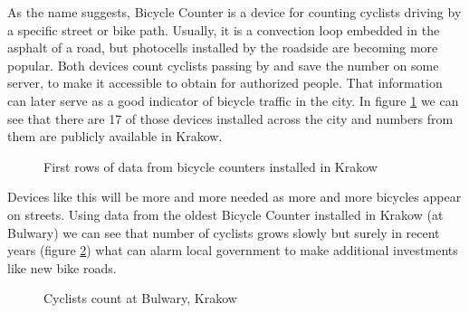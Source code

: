 As the name suggests, Bicycle Counter is a device for counting cyclists driving by a specific street or bike path. Usually, it is a convection loop embedded in the asphalt of a road, but photocells installed by the roadside are becoming more popular. Both devices count cyclists passing by and save the number on some server, to make it accessible to obtain for authorized people. That information can later serve as a good indicator of bicycle traffic in the city. In figure \ref{fig:countersKrakow} we can see that there are 17 of those devices installed across the city and numbers from them are publicly available in Krakow.
\begin{figure}[H]
    \centering
    \caption{First rows of data from bicycle counters installed in Krakow \cite{mobilnykrakow}}
    \label{fig:countersKrakow}
\end{figure}
Devices like this will be more and more needed as more and more bicycles appear on streets. Using data from the oldest Bicycle Counter installed in Krakow (at Bulwary) we can see that number of cyclists grows slowly but surely in recent years (figure \ref{fig:graph3}) what can alarm local government to make additional investments like new bike roads.
\begin{figure}[H]
    \centering
    \caption{Cyclists count at Bulwary, Krakow}
    \label{fig:graph3}
\end{figure}
